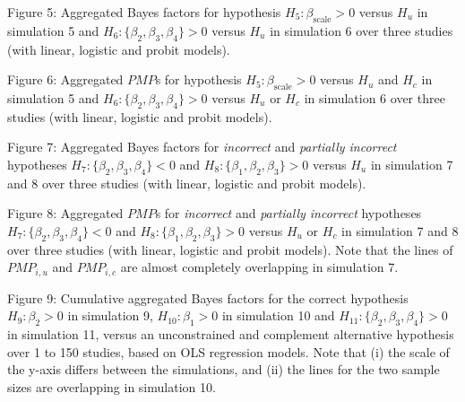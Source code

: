 \documentclass[
]{interact}
\begin{document}
Figure 5: Aggregated Bayes factors for hypothesis
\(H_5: \beta_{\text{scale}} > 0\) versus \(H_u\) in simulation 5 and
\(H_6: \{\beta_2, \beta_3, \beta_4\} > 0\) versus \(H_u\) in simulation
6 over three studies (with linear, logistic and probit models).

Figure 6: Aggregated \(PMP\)s for hypothesis
\(H_5: \beta_{\text{scale}} > 0\) versus \(H_u\) and \(H_c\) in
simulation 5 and \(H_6: \{\beta_2, \beta_3, \beta_4\} > 0\) versus
\(H_u\) or \(H_c\) in simulation 6 over three studies (with linear,
logistic and probit models).

Figure 7: Aggregated Bayes factors for \textit{incorrect} and
\textit{partially incorrect} hypotheses
\(H_7: \{\beta_2, \beta_3, \beta_4\} < 0\) and
\(H_8: \{\beta_1, \beta_2, \beta_3\} > 0\) versus \(H_u\) in simulation
7 and 8 over three studies (with linear, logistic and probit models).

Figure 8: Aggregated \(PMP\)s for \textit{incorrect} and
\textit{partially incorrect} hypotheses
\(H_7: \{\beta_2, \beta_3, \beta_4\} < 0\) and
\(H_8: \{\beta_1, \beta_2, \beta_3\} > 0\) versus \(H_u\) or \(H_c\) in
simulation 7 and 8 over three studies (with linear, logistic and probit
models). Note that the lines of \(PMP_{i,u}\) and \(PMP_{i,c}\) are
almost completely overlapping in simulation 7.

Figure 9: Cumulative aggregated Bayes factors for the correct hypothesis
\(H_9: \beta_2 > 0\) in simulation 9, \(H_{10}: \beta_1 > 0\) in
simulation 10 and \(H_{11}: \{\beta_2, \beta_3, \beta_4\} > 0\) in
simulation 11, versus an unconstrained and complement alternative
hypothesis over 1 to 150 studies, based on OLS regression models. Note
that (i) the scale of the y-axis differs between the simulations, and
(ii) the lines for the two sample sizes are overlapping in simulation
10.
\end{document}
